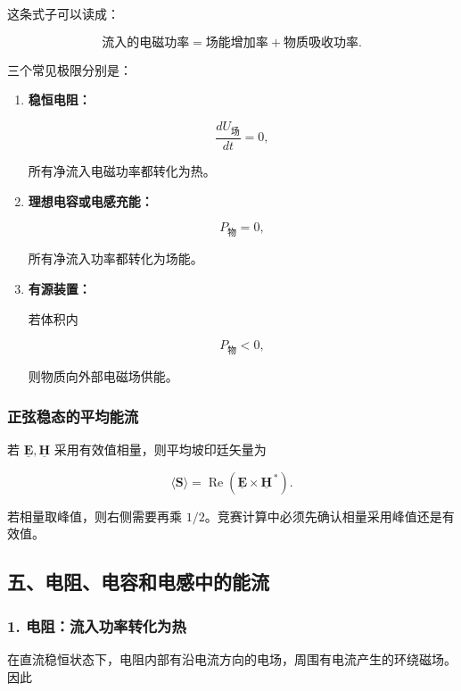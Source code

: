 这条式子可以读成：

\[
\boxed{
\text{流入的电磁功率}
=\text{场能增加率}
+\text{物质吸收功率}
}.
\]

三个常见极限分别是：

\begin{enumerate}
\def\labelenumi{\arabic{enumi}.}
\item
  \textbf{稳恒电阻：}

  \[
  \frac{dU_{\mathrm{\text{场}}}}{dt}=0,
  \]

  所有净流入电磁功率都转化为热。
\item
  \textbf{理想电容或电感充能：}

  \[
  P_{\mathrm{\text{物}}}=0,
  \]

  所有净流入功率都转化为场能。
\item
  \textbf{有源装置：}

  若体积内

  \[
  P_{\mathrm{\text{物}}}<0,
  \]

  则物质向外部电磁场供能。
\end{enumerate}

\subsubsection{正弦稳态的平均能流}\label{m7:ux6b63ux5f26ux7a33ux6001ux7684ux5e73ux5747ux80fdux6d41}

若 \(\underline{\mathbf E},\underline{\mathbf H}\)
采用有效值相量，则平均坡印廷矢量为

\[
\boxed{
\langle\mathbf S\rangle
=\operatorname{Re}
\left(\underline{\mathbf E}
\times\underline{\mathbf H}^{\,*}\right)
}.
\]

若相量取峰值，则右侧需要再乘
\(1/2\)。竞赛计算中必须先确认相量采用峰值还是有效值。

\subsection{五、电阻、电容和电感中的能流}\label{m7:ux4e94ux7535ux963bux7535ux5bb9ux548cux7535ux611fux4e2dux7684ux80fdux6d41}

\subsubsection{1.
电阻：流入功率转化为热}\label{m7:ux7535ux963bux6d41ux5165ux529fux7387ux8f6cux5316ux4e3aux70ed}

在直流稳恒状态下，电阻内部有沿电流方向的电场，周围有电流产生的环绕磁场。因此

